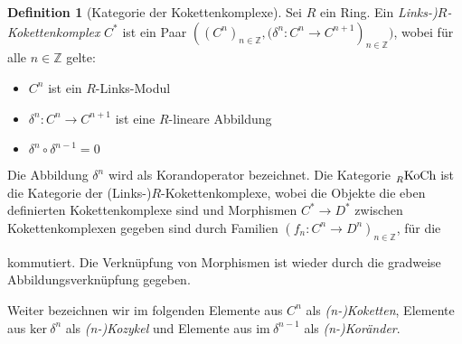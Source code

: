 \documentclass[a4paper,twoside,10pt]{scrreprt}
\newcommand{\Z}{\mathbb{Z}}
\theoremstyle{definition}
\newtheorem{definition}[satz]{Definition}
\begin{document}
\begin{definition}[Kategorie der Kokettenkomplexe]\label{def:CatCoChainComplex}
Sei $R$ ein Ring. Ein \emph{Links-)$R$-Kokettenkomplex} $C^*$ ist ein Paar $\left(\left(C^n \right)_{n\in \Z},\bigl(\delta^n:C^n\to C^{n+1}\right)_{n\in \Z}\bigr)$, wobei für alle $n\in \Z$ gelte:
\begin{itemize}
\item $C^n$ ist ein $R$-Links-Modul
\item $\delta^n:C^n\to C^{n+1}$ ist eine $R$-lineare Abbildung
\item $\delta^n\circ \delta^{n-1}=0$
\end{itemize}
Die Abbildung $\delta^n$ wird als Korandoperator bezeichnet.
Die Kategorie $\prescript{}{R}{\text{KoCh}}$ ist die Kategorie der (Links-)$R$-Kokettenkomplexe, wobei die Objekte die eben definierten Kokettenkomplexe sind und Morphismen $C^*\to D^*$ zwischen Kokettenkomplexen gegeben sind durch Familien $(f_n:C^n\to D^n)_{n\in\Z}$, für die
\begin{center}
\end{center}
kommutiert. Die Verknüpfung von Morphismen ist wieder durch die gradweise Abbildungsverknüpfung gegeben.\par
Weiter bezeichnen wir im folgenden Elemente aus $C^n$ als \textit{(n-)Koketten}, Elemente aus $\text{ker}~\delta^n$ als \textit{(n-)Kozykel} und Elemente aus $\text{im}~\delta^{n-1}$ als \textit{(n-)Koränder}.
\end{definition}
\end{document}

